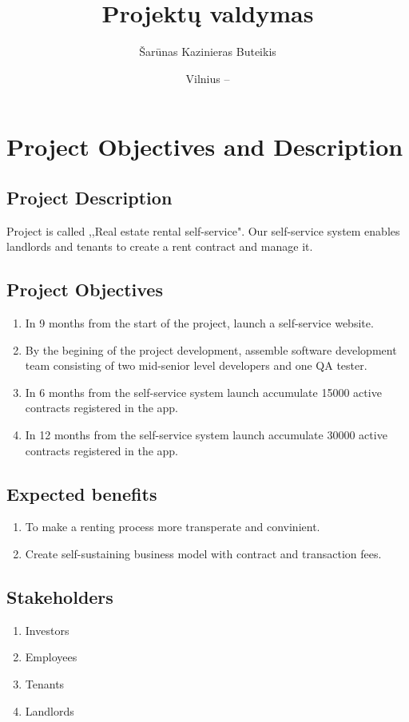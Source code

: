 \documentclass{VUMIFPSkursinis}
\title{Projektų valdymas}
\author{Šarūnas Kazinieras Buteikis}
\date{Vilnius – \the\year}
\begin{document}
\maketitle

\tableofcontents

\section{Project Objectives and Description}
	\subsection{Project Description}
		Project is called ,,Real estate rental self-service". 
		Our self-service system enables landlords and tenants to create a rent contract and manage it.

	\subsection{Project Objectives}
		\begin{enumerate}
			\item{In 9 months from the start of the project, launch a self-service website.}
			\item{By the begining of the project development, assemble software development team consisting of two mid-senior level developers and one QA tester.}
			\item{In 6 months from the self-service system launch accumulate 15000 active contracts registered in the app.}
			\item{In 12 months from the self-service system launch accumulate 30000 active contracts registered in the app.}
		\end{enumerate}

	\subsection{Expected benefits}
		\begin{enumerate}
			\item{To make a renting process more transperate and convinient.}
			\item{Create self-sustaining business model with contract and transaction fees.}
		\end{enumerate}

	\subsection{Stakeholders}
		\begin{enumerate}
			\item{Investors}
			\item{Employees}
			\item{Tenants}
			\item{Landlords}
		\end{enumerate}
\end{document}
